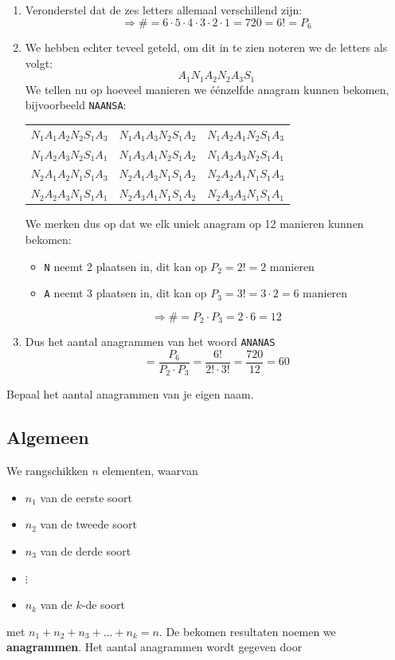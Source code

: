 \documentclass[12pt,a4paper,twoside]{article}
\begin{document}
\begin{enumerate}
  \item Veronderstel dat de zes letters allemaal verschillend zijn:\\
  $$\Rightarrow \#=6\cdot5\cdot4\cdot3\cdot2\cdot1=720=6!=P_6$$
  \item We hebben echter teveel geteld, om dit in te zien noteren we de letters als volgt:
  $$A_1N_1A_2N_2A_3S_1$$
  We tellen nu op hoeveel manieren we éénzelfde anagram kunnen bekomen, bijvoorbeeld \verb#NAANSA#:
  \begin{center}
  \begin{tabular}{ccc}
    $N_1A_1A_2N_2S_1A_3$ & $N_1A_1A_3N_2S_1A_2$ & $N_1A_2A_1N_2S_1A_3$\\
    $N_1A_2A_3N_2S_1A_1$ & $N_1A_3A_1N_2S_1A_2$ & $N_1A_3A_3N_2S_1A_1$\\
    $N_2A_1A_2N_1S_1A_3$ & $N_2A_1A_3N_1S_1A_2$ & $N_2A_2A_1N_1S_1A_3$\\
    $N_2A_2A_3N_1S_1A_1$ & $N_2A_3A_1N_1S_1A_2$ & $N_2A_3A_3N_1S_1A_1$\\
  \end{tabular}
  \end{center}
  We merken dus op dat we elk uniek anagram op 12 manieren kunnen bekomen:
  \begin{itemize}
    \item \verb#N# neemt 2 plaatsen in, dit kan op $P_2=2!=2$ manieren
    \item \verb#A# neemt 3 plaatsen in, dit kan op $P_3=3!=3\cdot2=6$ manieren
  \end{itemize}
  $$\Rightarrow \#=P_2\cdot P_3=2\cdot6=12$$
  \item Dus het aantal anagrammen van het woord \verb#ANANAS#
  $$=\dfrac{P_6}{P_2\cdot P_3}=\dfrac{6!}{2!\cdot 3!}=\dfrac{720}{12}=60$$
\end{enumerate}

\begin{oefening}
Bepaal het aantal anagrammen van je eigen naam.
\end{oefening}

\subsection{Algemeen}

We rangschikken $n$ elementen, waarvan
\begin{itemize}
  \item $n_1$ van de eerste soort
  \item $n_2$ van de tweede soort
  \item $n_3$ van de derde soort
  \item $\vdots$
  \item $n_k$ van de $k$-de soort
\end{itemize}
met $n_1+n_2+n_3+\dots+n_k=n$. De bekomen resultaten noemen we {\bf anagrammen}. Het aantal anagrammen wordt gegeven door
\end{document}
